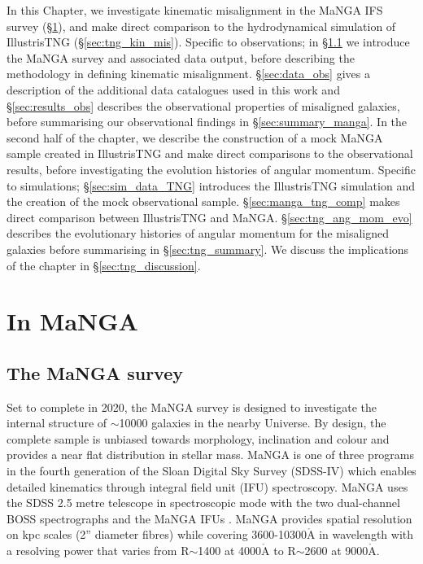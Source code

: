 In this Chapter, we investigate kinematic misalignment in the MaNGA IFS survey (\S\ref{sec:manga_kin_mis}), and make direct comparison to the hydrodynamical simulation of IllustrisTNG (\S\ref{sec:tng_kin_mis}). Specific to observations; in \S\ref{sec:manga_intro} we introduce the MaNGA survey and associated data output, before describing the methodology in defining kinematic misalignment. \S\ref{sec:data_obs} gives a description of the additional data catalogues used in this work and \S\ref{sec:results_obs} describes the observational properties of misaligned galaxies, before summarising our observational findings in \S\ref{sec:summary_manga}. In the second half of the chapter, we describe the construction of a mock MaNGA sample created in IllustrisTNG and make direct comparisons to the observational results, before investigating the evolution histories of angular momentum. Specific to simulations; \S\ref{sec:sim_data_TNG} introduces the IllustrisTNG simulation and the creation of the mock observational sample. \S\ref{sec:manga_tng_comp} makes direct comparison between IllustrisTNG and MaNGA. \S\ref{sec:tng_ang_mom_evo} describes the evolutionary histories of angular momentum for the misaligned galaxies before summarising in \S\ref{sec:tng_summary}. We discuss the implications of the chapter in \S\ref{sec:tng_discussion}.

\section{In MaNGA} \label{sec:manga_kin_mis}
\subsection{The MaNGA survey} \label{sec:manga_intro}
Set to complete in 2020, the MaNGA survey is designed to investigate the internal structure of $\sim$10000 galaxies in the nearby Universe. By design, the complete sample is unbiased towards morphology, inclination and colour and provides a near flat distribution in stellar mass. 
MaNGA is one of three programs in the fourth generation of the Sloan Digital Sky Survey (SDSS-IV) which enables detailed kinematics through integral field unit (IFU) spectroscopy. MaNGA uses the SDSS 2.5 metre telescope in spectroscopic mode \citep{gunn2006} with the two dual-channel BOSS spectrographs \citep{smee2013} and the MaNGA IFUs \citep{drory2015}. MaNGA provides spatial resolution on kpc scales (2'' diameter fibres) while covering 3600-10300$\mathrm{\mathring{A}}$ in wavelength with a resolving power that varies from R$\sim$1400 at 4000$\mathrm{\mathring{A}}$ to R$\sim$2600 at 9000$\mathrm{\mathring{A}}$. 

